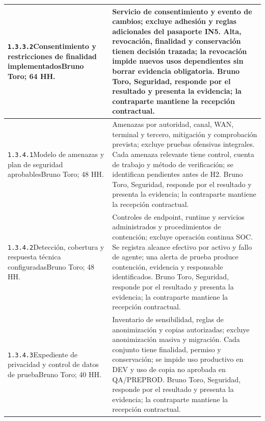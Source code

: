 \begin{longtable}{L{52mm}L{91mm}}
\texttt{1.\allowbreak{}3.\allowbreak{}3.\allowbreak{}2}\newline Consentimiento y restricciones de finalidad implementados\newline Bruno Toro; 64 HH. & Servicio de consentimiento y evento de cambios; excluye adhesión y reglas adicionales del pasaporte IN5. Alta, revocación, finalidad y conservación tienen decisión trazada; la revocación impide nuevos usos dependientes sin borrar evidencia obligatoria. Bruno Toro, Seguridad, responde por el resultado y presenta la evidencia; la contraparte mantiene la recepción contractual.\\\hline
\texttt{1.\allowbreak{}3.\allowbreak{}4.\allowbreak{}1}\newline Modelo de amenazas y plan de seguridad aprobables\newline Bruno Toro; 48 HH. & Amenazas por autoridad, canal, WAN, terminal y tercero, mitigación y comprobación prevista; excluye pruebas ofensivas integrales. Cada amenaza relevante tiene control, cuenta de trabajo y método de verificación; se identifican pendientes antes de H2. Bruno Toro, Seguridad, responde por el resultado y presenta la evidencia; la contraparte mantiene la recepción contractual.\\\hline
\texttt{1.\allowbreak{}3.\allowbreak{}4.\allowbreak{}2}\newline Detección, cobertura y respuesta técnica configuradas\newline Bruno Toro; 48 HH. & Controles de endpoint, runtime y servicios administrados y procedimientos de contención; excluye operación continua SOC. Se registra alcance efectivo por activo y fallo de agente; una alerta de prueba produce contención, evidencia y responsable identificados. Bruno Toro, Seguridad, responde por el resultado y presenta la evidencia; la contraparte mantiene la recepción contractual.\\\hline
\texttt{1.\allowbreak{}3.\allowbreak{}4.\allowbreak{}3}\newline Expediente de privacidad y control de datos de prueba\newline Bruno Toro; 40 HH. & Inventario de sensibilidad, reglas de anonimización y copias autorizadas; excluye anonimización masiva y migración. Cada conjunto tiene finalidad, permiso y conservación; se impide uso productivo en DEV y uso de copia no aprobada en QA/PREPROD. Bruno Toro, Seguridad, responde por el resultado y presenta la evidencia; la contraparte mantiene la recepción contractual.\\\hline

\end{longtable}
